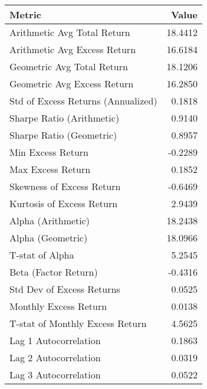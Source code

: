 \begin{tabular}{lr}
\toprule
                            Metric &   Value \\
\midrule
       Arithmetic Avg Total Return & 18.4412 \\
      Arithmetic Avg Excess Return & 16.6184 \\
        Geometric Avg Total Return & 18.1206 \\
       Geometric Avg Excess Return & 16.2850 \\
Std of Excess Returns (Annualized) &  0.1818 \\
         Sharpe Ratio (Arithmetic) &  0.9140 \\
          Sharpe Ratio (Geometric) &  0.8957 \\
                 Min Excess Return & -0.2289 \\
                 Max Excess Return &  0.1852 \\
         Skewness of Excess Return & -0.6469 \\
         Kurtosis of Excess Return &  2.9439 \\
                Alpha (Arithmetic) & 18.2438 \\
                 Alpha (Geometric) & 18.0966 \\
                   T-stat of Alpha &  5.2545 \\
              Beta (Factor Return) & -0.4316 \\
         Std Dev of Excess Returns &  0.0525 \\
             Monthly Excess Return &  0.0138 \\
   T-stat of Monthly Excess Return &  4.5625 \\
             Lag 1 Autocorrelation &  0.1863 \\
             Lag 2 Autocorrelation &  0.0319 \\
             Lag 3 Autocorrelation &  0.0522 \\
\bottomrule
\end{tabular}
